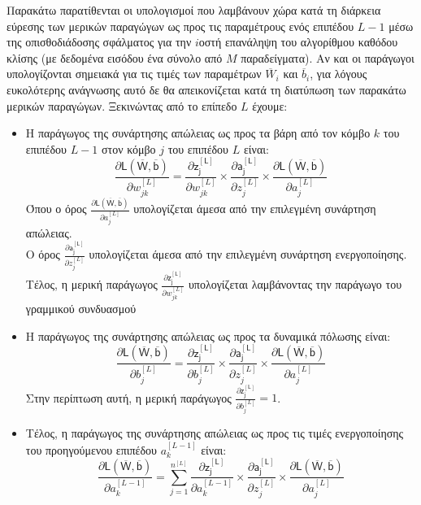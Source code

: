 Παρακάτω παρατίθενται οι υπολογισμοί που λαμβάνουν χώρα κατά τη διάρκεια εύρεσης των μερικών παραγώγων ως προς τις παραμέτρους ενός επιπέδου $L-1$ μέσω της οπισθοδιάδοσης σφάλματος για την $i$\textendash οστή επανάληψη του αλγορίθμου καθόδου κλίσης (με δεδομένα εισόδου ένα σύνολο από $M$ παραδείγματα). Αν και οι παράγωγοι υπολογίζονται σημειακά για τις τιμές των παραμέτρων $\overline{W}_i$ και $\overline{b}_i$, για λόγους ευκολότερης ανάγνωσης αυτό δε θα απεικονίζεται κατά τη διατύπωση των παρακάτω μερικών παραγώγων. Ξεκινώντας από το επίπεδο $L$ έχουμε:
\begin{itemize}
  \item Η παράγωγος της συνάρτησης απώλειας ως προς τα βάρη από τον κόμβο $k$ του επιπέδου $L-1$ στον κόμβο $j$ του επιπέδου $L$ είναι:
  \begin{equation}\label{eq:dw}
    \frac{\partial \mathsf{L(\overline{W},\overline{b})}}{{\partial w^{[L]}_{jk}}} = 
    \frac{\partial \mathsf{z_j^{[L]}}}{{\partial w^{[L]}_{jk}}} \times
    \frac{\partial \mathsf{a_j^{[L]}}}{{\partial z_j^{[L]}}} \times
    \frac{\partial \mathsf{L(\overline{W},\overline{b})}}{{\partial a^{[L]}_{j}}}
  \end{equation}
  Όπου ο όρος $\frac{\partial \mathsf{L(\overline{W},\overline{b})}}{{\partial a^{[L]}_{j}}}$ υπολογίζεται άμεσα από την επιλεγμένη συνάρτηση απώλειας.\\ 
  Ο όρος $\frac{\partial \mathsf{a_j^{[L]}}}{{\partial z_j^{[L]}}}$ υπολογίζεται άμεσα από την επιλεγμένη συνάρτηση ενεργοποίησης.\\
  Τέλος, η μερική παράγωγος $\frac{\partial \mathsf{z_j^{[L]}}}{{\partial w^{[L]}_{jk}}}$ υπολογίζεται λαμβάνοντας την παράγωγο του γραμμικού συνδυασμού 
  \item Η παράγωγος της συνάρτησης απώλειας ως προς τα δυναμικά πόλωσης είναι:
  \begin{equation}\label{eq:db}
    \frac{\partial \mathsf{L(\overline{W},\overline{b})}}{{\partial b^{[L]}_{j}}} = 
    \frac{\partial \mathsf{z_j^{[L]}}}{{\partial b^{[L]}_{j}}} \times
    \frac{\partial \mathsf{a_j^{[L]}}}{{\partial z_j^{[L]}}} \times
    \frac{\partial \mathsf{L(\overline{W},\overline{b})}}{{\partial a^{[L]}_{j}}}
  \end{equation}
  Στην περίπτωση αυτή, η μερική παράγωγος $\frac{\partial \mathsf{z_j^{[L]}}}{{\partial b^{[L]}_{j}}} = 1$.
  \item Τέλος, η παράγωγος της συνάρτησης απώλειας ως προς τις τιμές ενεργοποίησης του προηγούμενου επιπέδου $a^{[L-1]}_{k}$ είναι:
  \begin{equation}\label{eq:da L-1}
    \frac{\partial \mathsf{L(\overline{W},\overline{b})}}{{\partial a^{[L-1]}_{k}}} = 
\sum_{j = 1}^{n^{[L]}}     \frac{\partial \mathsf{z_j^{[L]}}}{{\partial a^{[L-1]}_{k}}} \times
    \frac{\partial \mathsf{a_j^{[L]}}}{{\partial z_j^{[L]}}} \times
    \frac{\partial \mathsf{L(\overline{W},\overline{b})}}{{\partial a^{[L]}_{j}}} 
  \end{equation}

\end{itemize}
